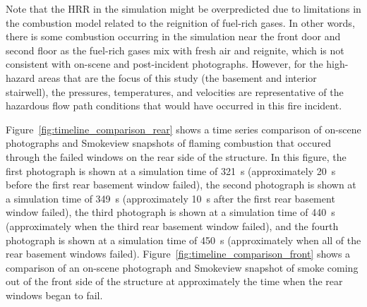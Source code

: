 \documentclass[12pt,oneside]{book}
\begin{document}
Note that the HRR in the simulation might be overpredicted due to limitations in the combustion model related to the reignition of fuel-rich gases. In other words, there is some combustion occurring in the simulation near the front door and second floor as the fuel-rich gases mix with fresh air and reignite, which is not consistent with on-scene and post-incident photographs. However, for the high-hazard areas that are the focus of this study (the basement and interior stairwell), the pressures, temperatures, and velocities are representative of the hazardous flow path conditions that would have occurred in this fire incident.

Figure~\ref{fig:timeline_comparison_rear} shows a time series comparison of on-scene photographs and Smokeview snapshots of flaming combustion that occured through the failed windows on the rear side of the structure. In this figure, the first photograph is shown at a simulation time of 321~s (approximately 20~s before the first rear basement window failed), the second photograph is shown at a simulation time of 349~s (approximately 10~s after the first rear basement window failed), the third photograph is shown at a simulation time of 440~s (approximately when the third rear basement window failed), and the fourth photograph is shown at a simulation time of 450~s (approximately when all of the rear basement windows failed). Figure~\ref{fig:timeline_comparison_front} shows a comparison of an on-scene photograph and Smokeview snapshot of smoke coming out of the front side of the structure at approximately the time when the rear windows began to fail.
\end{document}
